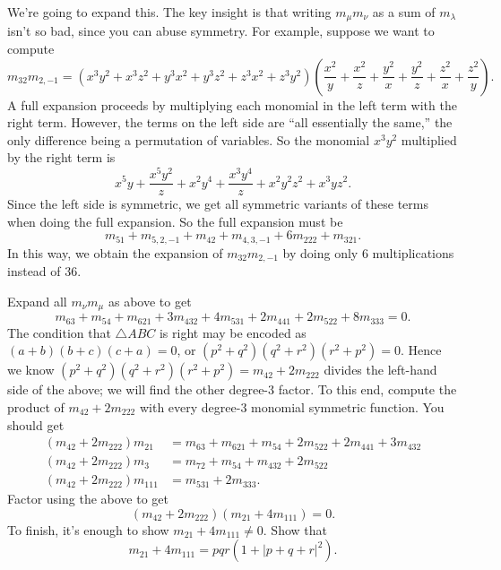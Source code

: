 \documentclass[11pt]{scrartcl}
\begin{document}
\begin{walkthrough}
	We're going to expand this. The key insight is that writing $m_\mu m_\nu$ as a sum of $m_\lambda$ isn't so bad, since you can abuse symmetry. For example, suppose we want to compute
	\[m_{32}m_{2,-1} = (x^3y^2 + x^3z^2 + y^3x^2 + y^3z^2 + z^3x^2 + z^3y^2)\left( \frac{x^2}y + \frac{x^2}z + \frac{y^2}x + \frac{y^2}z + \frac{z^2}x + \frac{z^2}y \right).\]
	A full expansion proceeds by multiplying each monomial in the left term with the right term. However, the terms on the left side are ``all essentially the same,'' the only difference being a permutation of variables. So the monomial $x^3y^2$ multiplied by the right term is
	\[x^5y + \frac{x^5y^2}z + x^2y^4 + \frac{x^3y^4}z + x^2y^2z^2 + x^3yz^2.\]
	Since the left side is symmetric, we get all symmetric variants of these terms when doing the full expansion. So the full expansion must be
	\[m_{51} + m_{5,2,-1} + m_{42} + m_{4,3,-1} + 6m_{222} + m_{321}.\]
	In this way, we obtain the expansion of $m_{32}m_{2,-1}$ by doing only $6$ multiplications instead of $36$.

	\begin{walk}[resume]
		\ii Expand all $m_\nu m_\mu$ as above to get
		\[m_{63} + m_{54} + m_{621} + 3m_{432} + 4m_{531} + 2m_{441} + 2m_{522} + 8m_{333} = 0.\]
		\ii The condition that $\triangle ABC$ is right may be encoded as $(a + b)(b + c)(c + a) = 0$, or $(p^2 + q^2)(q^2 + r^2)(r^2 + p^2) = 0$. Hence we know $(p^2 + q^2)(q^2 + r^2)(r^2 + p^2) = m_{42} + 2m_{222}$ divides the left-hand side of the above; we will find the other degree-$3$ factor. To this end, compute the product of $m_{42} + 2m_{222}$ with every degree-$3$ monomial symmetric function. You should get
		\begin{align*}
			(m_{42} + 2m_{222})m_{21} &= m_{63} + m_{621} + m_{54} + 2m_{522} + 2m_{441} + 3m_{432} \\
			(m_{42} + 2m_{222})m_3 &= m_{72} + m_{54} + m_{432} + 2m_{522} \\
			(m_{42} + 2m_{222})m_{111} &= m_{531} + 2m_{333}.
		\end{align*}
		\ii Factor using the above to get
		\[(m_{42} + 2m_{222})(m_{21} + 4m_{111}) = 0.\]
		\ii To finish, it's enough to show $m_{21} + 4m_{111} \neq 0$. Show that
		\[m_{21} + 4m_{111} = pqr(1 + \lvert p + q + r\rvert^2).\]
	\end{walk}
\end{walkthrough}
\end{document}
